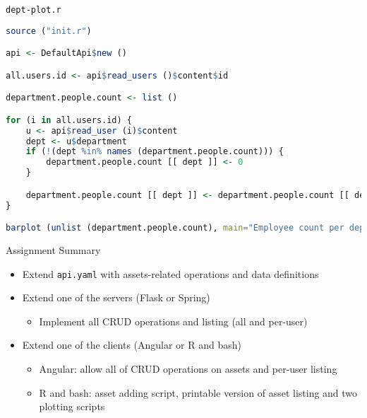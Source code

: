 \begin{frame}[fragile]{\lstinline{dept-plot.r}}
\begin{lstlisting}[language=r,style=mini]
source ("init.r")

api <- DefaultApi$new ()

all.users.id <- api$read_users ()$content$id

department.people.count <- list ()

for (i in all.users.id) {
    u <- api$read_user (i)$content
    dept <- u$department
    if (!(dept %in% names (department.people.count))) {
        department.people.count [[ dept ]] <- 0
    }

    department.people.count [[ dept ]] <- department.people.count [[ dept ]] + 1
}

barplot (unlist (department.people.count), main="Employee count per department")
\end{lstlisting}
\end{frame}


\begin{frame}{Assignment Summary}
    \begin{itemize}
        \item Extend \lstinline{api.yaml} with assets-related operations and data definitions
        \item Extend one of the servers (Flask or Spring)
            \begin{itemize}
                \item Implement all CRUD operations and listing (all and per-user)
            \end{itemize}
        \item Extend one of the clients (Angular or R and bash)
            \begin{itemize}
                \item Angular: allow all of CRUD operations on assets and per-user listing
                \item R and bash: asset adding script, printable version of asset listing and two plotting scripts
            \end{itemize}
    \end{itemize}
\end{frame}
